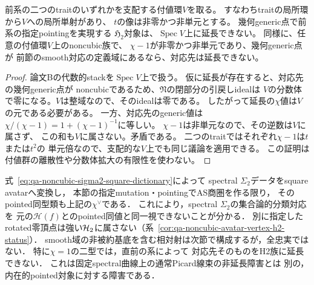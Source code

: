 \begin{corollary}[任意の支配的付値基底での延長不能]
\label{cor:qa-spectral-no-extension-over-valuations}
前系の二つのtraitのいずれかを支配する付値環$V$を取る。
すなわちtraitの局所環から$V$への局所単射があり、
$t$の像は非零かつ非単元とする。
幾何generic点で前系の指定pointingを実現する
$\mathfrak H_2$対象は、$\operatorname{Spec}V$上に延長できない。
同様に、任意の付値環$V$上のnoncubic族で、
$\chi-1$が非零かつ非単元であり、幾何generic点が
前節のsmooth対応の定義域にあるなら、対応先は延長できない。
\end{corollary}
\begin{proof}
論文Bの代数的stackを$\operatorname{Spec}V$上で扱う。
仮に延長が存在すると、対応先の幾何generic点が
noncubicであるため、$\mathfrak N$の閉部分の引戻しidealは
$V$の分数体で零になる。$V$は整域なので、そのidealは零である。
したがって延長の$\chi$値は$V$の元である必要がある。
一方、対応先のgeneric値は
$\chi/(\chi-1)=1+(\chi-1)^{-1}$に等しい。
$\chi-1$は非単元なので、その逆数は$V$に属さず、
この和も$V$に属さない。矛盾である。
二つのtraitではそれぞれ$\chi-1$は$t$または$t^2$の
単元倍なので、支配的な$V$上でも同じ議論を適用できる。
この証明は付値群の離散性や分数体拡大の有限性を使わない。
\end{proof}

\begin{remark}
\label{rem:qa-sigma2-spectral-involution-scope}
式~\eqref{eq:qa-noncubic-sigma2-square-dictionary}によって
spectral $\Sigma_2$データをsquare avatarへ変換し，
本節の指定mutation・pointingでAS商圏を作る限り，
そのpointed同型類も上記の$\chi^\vee$である．
これにより，spectral $\Sigma_2$の集合論的分類対応を
元の$\mathcal H(f)$とのpointed同値と同一視できないことが分かる．
別に指定したrotated零頂点は強い$\mathcal H_2$に属さない（系~\ref{cor:qa-noncubic-avatar-vertex-h2-status}）．
smooth域の非被約基底を含む相対射は次節で構成するが，全忠実ではない．
特に$\chi=1$の二型では，直前の系によって
対応先そのものをH2族に延長できない．
これは固定spectral曲線上の通常Picard線束の非延長障害とは
別の，内在的pointed対象に対する障害である．
\end{remark}
